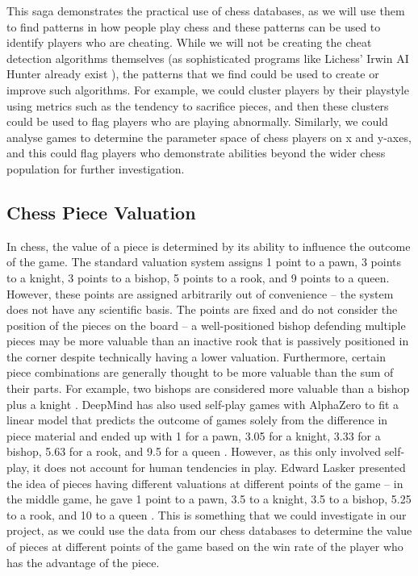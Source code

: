 \documentclass[%
 superscriptaddress,
showpacs,preprintnumbers,
 amsmath,
 amssymb,
 aps,
 pra,
showkeys,
onecolumn,
notitlepage,
11pt,
tightenlines      %
]{revtex4-1}
\begin{document}
This saga demonstrates the practical use of chess databases, as we will use them to find patterns in how people play chess and these patterns can be used to identify players who are cheating. While we will not be creating the cheat detection algorithms themselves (as sophisticated programs like Lichess' Irwin AI Hunter already exist \cite{lichessIrwinCheatDetection}), the patterns that we find could be used to create or improve such algorithms. For example, we could cluster players by their playstyle using metrics such as the tendency to sacrifice pieces, and then these clusters could be used to flag players who are playing abnormally. Similarly, we could analyse games to determine the parameter space of chess players on x and y-axes, and this could flag players who demonstrate abilities beyond the wider chess population for further investigation.

\subsection{Chess Piece Valuation}
In chess, the value of a piece is determined by its ability to influence the outcome of the game. The standard valuation system assigns 1 point to a pawn, 3 points to a knight, 3 points to a bishop, 5 points to a rook, and 9 points to a queen. However, these points are assigned arbitrarily out of convenience -- the system does not have any scientific basis. The points are fixed and do not consider the position of the pieces on the board -- a well-positioned bishop defending multiple pieces may be more valuable than an inactive rook that is passively positioned in the corner despite technically having a lower valuation. Furthermore, certain piece combinations are generally thought to be more valuable than the sum of their parts. For example, two bishops are considered more valuable than a bishop plus a knight \cite{timoshchenko1993bishop}. DeepMind has also used self-play games with AlphaZero to fit a linear model that predicts the outcome of games solely from the difference in piece material and ended up with 1 for a pawn, 3.05 for a knight, 3.33 for a bishop, 5.63 for a rook, and 9.5 for a queen \cite{tomavsev2020assessing}. However, as this only involved self-play, it does not account for human tendencies in play. Edward Lasker presented the idea of pieces having different valuations at different points of the game -- in the middle game, he gave 1 point to a pawn, 3.5 to a knight, 3.5 to a bishop, 5.25 to a rook, and 10 to a queen \cite{lasker2021chess}. This is something that we could investigate in our project, as we could use the data from our chess databases to determine the value of pieces at different points of the game based on the win rate of the player who has the advantage of the piece.
\end{document}
